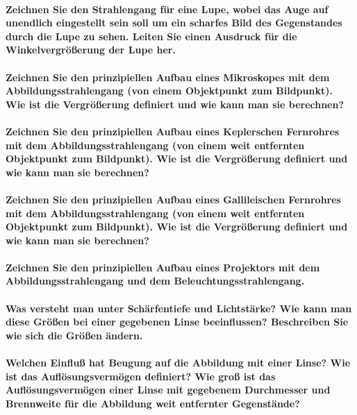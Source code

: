\documentclass[a4paper, 11pt, parskip=half]{scrartcl}
\begin{document}
\paragraph{Zeichnen Sie den Strahlengang für eine Lupe, wobei das Auge auf unendlich eingestellt
sein soll um ein scharfes Bild des Gegenstandes durch die Lupe zu sehen. Leiten Sie einen Ausdruck
für die Winkelvergrößerung der Lupe her.}

\paragraph{Zeichnen Sie den prinzipiellen Aufbau eines Mikroskopes mit dem Abbildungsstrahlengang
(von einem Objektpunkt zum Bildpunkt). Wie ist die Vergrößerung definiert und wie kann man sie
berechnen?}

\paragraph{Zeichnen Sie den prinzipiellen Aufbau eines Keplerschen Fernrohres mit dem
Abbildungsstrahlengang (von einem weit entfernten Objektpunkt zum Bildpunkt). Wie ist die
Vergrößerung definiert und wie kann man sie berechnen?}

\paragraph{Zeichnen Sie den prinzipiellen Aufbau eines Gallileischen Fernrohres mit dem
Abbildungsstrahlengang (von einem weit entfernten Objektpunkt zum Bildpunkt). Wie ist die
Vergrößerung definiert und wie kann man sie berechnen?}

\paragraph{Zeichnen Sie den prinzipiellen Aufbau eines Projektors mit dem Abbildungsstrahlengang
und dem Beleuchtungsstrahlengang.}

\paragraph{Was versteht man unter Schärfentiefe und Lichtstärke? Wie kann man diese Größen bei
einer gegebenen Linse beeinflussen? Beschreiben Sie wie sich die Größen ändern.}

\paragraph{Welchen Einfluß hat Beugung auf die Abbildung mit einer Linse? Wie ist das
Auflösungsvermögen definiert? Wie groß ist das Auflösungsvermögen einer Linse mit gegebenem
Durchmesser und Brennweite für die Abbildung weit entfernter Gegenstände?}
\end{document}
